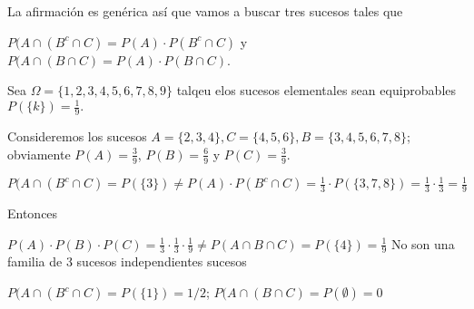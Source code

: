 \documentclass[
]{article}
\begin{document}
La afirmación es genérica así que vamos a buscar tres sucesos tales que

\(P(A\cap (B^c\cap C)=P(A)\cdot P(B^c\cap C)\) y
\(P(A\cap (B\cap C)=P(A)\cdot P(B\cap C)\).

Sea \(\Omega=\{1,2,3,4,5,6,7,8,9\}\) talqeu elos sucesos elementales
sean equiprobables \(P(\{k\})=\frac19.\)

Consideremos los sucesos
\(A=\{2,3,4\}, C=\{4,5,6\}, B=\{3,4,5,6,7,8\}\); obviamente
\(P(A)= \frac39\), \(P(B)=\frac{6}{9}\) y \(P(C)=\frac{3}{9}.\)

\(P(A\cap (B^c\cap C)=P(\{3\})\not = P(A)\cdot P(B^c\cap C)= \frac13\cdot P(\{3,7,8\})=\frac13\cdot \frac13=\frac19\)

Entonces

\(P(A)\cdot P(B)\cdot P(C)=\frac13\cdot \frac13\cdot \frac19\neq P(A\cap B\cap C)=P(\{4\})=\frac19\)
No son una familia de 3 sucesos independientes sucesos

\(P(A\cap (B^c\cap C)=P(\{1\})=1/2\);
\(P(A\cap (B\cap C)=P(\emptyset)=0\)
\end{document}
